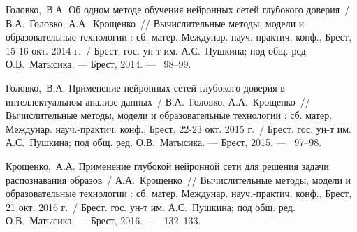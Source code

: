Головко,~В.А. Об одном методе обучения нейронных сетей глубокого доверия~/ В.А.~Головко, А.А.~Крощенко~// 
\newblock Вычислительные методы, модели и образовательные технологии : сб. матер. Междунар. науч.-практич. конф., Брест, 15-16 окт. 2014 г.~/
\newblock Брест. гос. ун-т им. А.С.~Пушкина; под общ. ред. О.В.~Матысика. ---
\newblock Брест, 2014. ---
~98--99.

Головко,~В.А. Применение нейронных сетей глубокого доверия в интеллектуальном анализе данных~/ В.А.~Головко, А.А.~Крощенко~// 
\newblock Вычислительные методы, модели и образовательные технологии : сб. матер. Междунар. науч.-практич. конф., Брест, 22-23 окт. 2015 г.~/
\newblock Брест. гос. ун-т им. А.С.~Пушкина; под общ. ред. О.В.~Матысика. ---
\newblock Брест, 2015. ---
~97--98.

Крощенко,~А.А. Применение глубокой нейронной сети для решения задачи распознавания образов~/ А.А.~Крощенко~// 
\newblock Вычислительные методы, модели и образовательные технологии : сб. матер. Междунар. науч.-практич. конф., Брест, 21 окт. 2016 г.~/
\newblock Брест. гос. ун-т им. А.С.~Пушкина; под общ. ред. О.В.~Матысика. ---
\newblock Брест, 2016. ---
~132--133.




